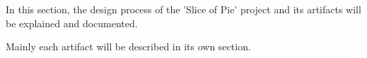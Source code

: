In this section, the design process of the 'Slice of Pie' project and its artifacts will be explained and documented.

Mainly each artifact will be described in its own section.


